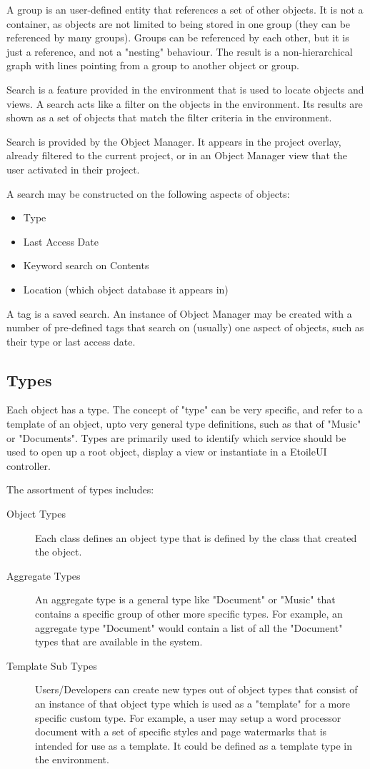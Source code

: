 \documentclass[11pt]{report}
\begin{document}
A group is an user-defined entity that references a set of other objects. It is not a container, as objects are not limited to being stored in one group (they can be referenced by many groups). Groups can be referenced by each other, but it is just a reference, and not a "nesting" behaviour. The result is a non-hierarchical graph with lines pointing from a group to another object or group.

Search is a feature provided in the environment that is used to locate objects and views. A search acts like a filter on the objects in the environment. Its results are shown as a set of objects that match the filter criteria in the environment.

Search is provided by the Object Manager.  It appears in the project overlay, already filtered to the current project, or in an Object Manager view that the user activated in their project.

A search may be constructed on the following aspects of objects:
\begin{itemize}
\item Type
\item Last Access Date
\item Keyword search on Contents
\item Location (which object database it appears in)
\end{itemize}

A tag is a saved search. An instance of Object Manager may be created with a number of pre-defined tags that search on (usually) one aspect of objects, such as their type or last access date.

\subsection{Types}

Each object has a type. The concept of "type" can be very specific, and refer to a template of an object, upto very general type definitions, such as that of "Music" or "Documents". Types are primarily used to identify which service should be used to open up a root object, display a view or instantiate in a EtoileUI controller.

The assortment of types includes:
\begin {description}
\item[Object Types] Each class defines an object type that is defined by the class that created the object.
\item[Aggregate Types] An aggregate type is a general type like "Document" or "Music" that contains a specific group of other more specific types. For example, an aggregate type "Document" would contain a list of all the "Document" types that are available in the system.
\item[Template Sub Types] Users/Developers can create new types out of object types that consist of an instance of that object type which is used as a "template" for a more specific custom  type. For example, a user may setup a word processor document with a set of specific styles and page watermarks that is intended for use as a template. It could be defined as a template type in the environment.
\end{description}
\end{document}
